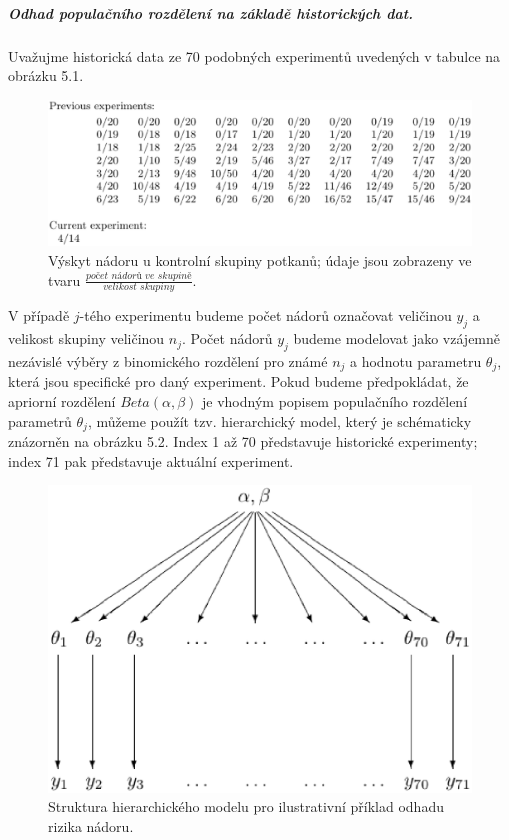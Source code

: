 \subparagraph{Odhad populačního rozdělení na základě historických dat.} Uvažujme historická data ze 70 podobných experimentů uvedených v tabulce na obrázku 5.1.
\begin{figure}[htp]
\centering
\includegraphics[scale = 0.45]{pictures/tbl_5_1.eps}
\caption{Výskyt nádoru u kontrolní skupiny potkanů; údaje jsou zobrazeny ve tvaru $\frac{\textit{počet nádorů ve skupině}}{\textit{velikost skupiny}}$.}
\label{tbl_5_1}
\end{figure}
V případě $j$-tého experimentu budeme počet nádorů označovat veličinou $y_j$ a velikost skupiny veličinou $n_j$. Počet nádorů $y_j$ budeme modelovat jako vzájemně nezávislé výběry z binomického rozdělení pro známé $n_j$ a hodnotu parametru $\theta_j$, která jsou specifické pro daný experiment. Pokud budeme předpokládat, že apriorní rozdělení $\textit{Beta}(\alpha, \beta)$ je vhodným popisem populačního rozdělení parametrů $\theta_j$, můžeme použít tzv. hierarchický model, který je schématicky znázorněn na obrázku 5.2. Index 1 až 70 představuje historické experimenty; index 71 pak představuje aktuální experiment.
\begin{figure}[htp]
\centering
\includegraphics[scale = 0.45]{pictures/fig_5_1.eps}
\caption{Struktura hierarchického modelu pro ilustrativní příklad odhadu rizika nádoru.}
\label{fig_5_1}
\end{figure}
